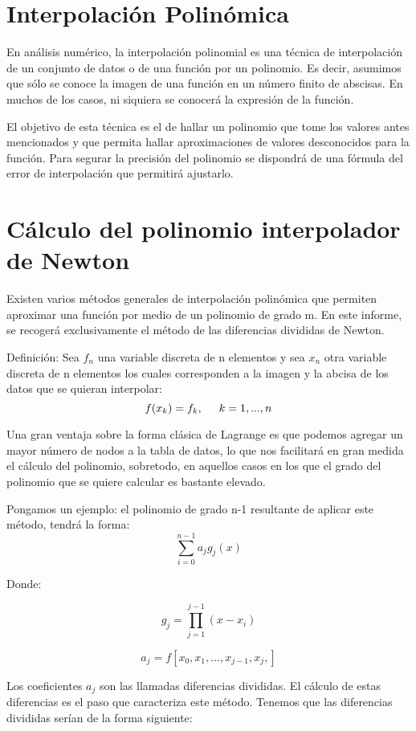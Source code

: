 



\section{Interpolación Polinómica}
\label{2:sec:1}
En análisis numérico, la interpolación polinomial es una técnica de interpolación de un conjunto de datos o de una función por un polinomio. Es decir, asumimos que sólo se conoce la imagen de una función en un número finito de abscisas. En muchos de los casos, ni siquiera se conocerá la expresión de la función.\par El objetivo de esta técnica es el de hallar un polinomio que tome los valores antes mencionados y que permita hallar aproximaciones de valores desconocidos para la función. Para segurar la precisión del polinomio se dispondrá de una fórmula del error de interpolación que permitirá ajustarlo.

\section{Cálculo del polinomio interpolador de Newton}
\label{2:sec:2}
  Existen varios métodos generales de interpolación polinómica que permiten aproximar una función por medio de un polinomio de grado m. En este informe, se recogerá exclusivamente el método de las diferencias divididas de Newton.\par Definición: Sea $f_{n}$  una variable discreta de n  elementos y sea $x_{n}$ otra variable discreta de n elementos los cuales corresponden a la imagen y la abcisa de los datos que se quieran interpolar:
  \[f(x_{k})=f_{k}, \hspace{0.5 cm} k=1,...,n\]\par
  Una gran ventaja sobre la forma clásica de Lagrange es que podemos agregar un mayor número de nodos a la tabla de datos, lo que nos facilitará en gran medida el cálculo del polinomio, sobretodo, en aquellos casos en los que el grado del polinomio que se quiere calcular es bastante elevado.\par Pongamos un ejemplo: el polinomio de grado n-1  resultante de aplicar este método, tendrá la forma:
  \[\sum_{i=0}^{n-1} {a_j}{g_j}(x)\]\par Donde:\par \[ g_{j}=\prod_{j=1}^{j-1}{(x-x_{i})}\]\par
  \[ a_{j}=f[x_{0},x_{1},...,x_{j-1},x_{j},]\]\par Los coeficientes $a_{j}$ son las llamadas diferencias divididas. El cálculo de estas diferencias es el paso que caracteriza este método. Tenemos que las diferencias divididas serían de la forma siguiente:
  
  \vspace{1.5 true cm}
  
